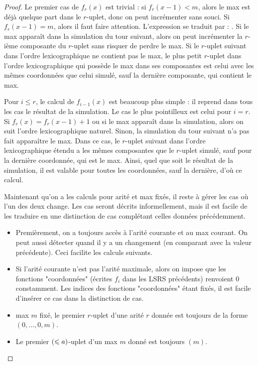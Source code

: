 \begin{proof}
			Le premier cas de $f_{r}(x)$ est trivial : si $f_{r}(x-1)<m$, alors le max est déjà quelque part dans le $r$-uplet, donc on peut incrémenter sans souci. Si $f_{r}(x-1) = m$, alors il faut faire attention. L'expression  se traduit par : . Si le max apparaît dans la simulation du tour suivant, alors on peut incrémenter la $r$-ième composante du $r$-uplet sans risquer de perdre le max. Si le $r$-uplet suivant dans l'ordre lexicographique ne contient pas le max, le plus petit $r$-uplet dans l'ordre lexicographique qui possède le max dans ses composantes est celui avec les mêmes coordonnées que celui simulé, sauf la dernière composante, qui contient le max.
			
			Pour $i\leqslant r$, le calcul de $f_{i-1}(x)$ est beaucoup plus simple : il reprend dans tous les cas le résultat de la simulation. Le cas le plus pointilleux est celui pour $i=r$. Si $f_{r}(x) = f_{r}(x-1) + 1$ ou si le max apparaît dans la simulation, alors on suit l'ordre lexicographique naturel. Sinon, la simulation du tour suivant n'a pas fait apparaître le max. Dans ce cas, le $r$-uplet suivant dans l'ordre lexicographique étendu a les mêmes composantes que le $r$-uplet simulé, sauf pour la dernière coordonnée, qui est le max. Ainsi, quel que soit le résultat de la simulation, il est valable pour toutes les coordonnées, sauf la dernière, d'où ce calcul.
			
			
			Maintenant qu'on a les calculs pour arité et max fixés, il reste à gérer les cas où l'un des deux change. Les cas seront décrits informellement, mais il est facile de les traduire en une distinction de cas complétant celles données précédemment.
			
			\begin{itemize}[itemsep=-1mm]
				\item 	Premièrement, on a toujours accès à l'arité courante et au max courant. On peut aussi détecter quand il y a un changement (en comparant avec la valeur précédente). Ceci facilite les calculs suivants.
				
				\item 	Si l'arité courante n'est pas l'arité maximale, alors on impose que les fonctions "coordonnées" (écrites $f_i$ dans les LSRS précédents) renvoient $0$ constamment. Les indices des fonctions "coordonnées" étant fixés, il est facile d'insérer ce cas dans la distinction de cas. 
				
				\item 	 max $m$ fixé, le premier $r$-uplet d'une arité $r$ donnée est toujours de la forme $\left(0, \dots, 0, m\right)$. 
				
				\item 	Le premier $\left( \leqslant a \right)$-uplet d'un max $m$ donné est toujours $(m)$. 
			\end{itemize}
		
		
		
	\end{proof}
	
